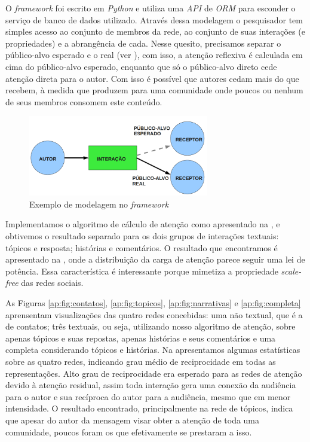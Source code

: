 O \emph{framework} foi escrito em \emph{Python} e utiliza uma \emph{API} de
\emph{ORM} para esconder o serviço de banco de dados utilizado. Através dessa
modelagem o pesquisador tem simples acesso ao conjunto de membros da rede, ao
conjunto de suas interações (e propriedades) e a abrangência de cada. Nesse
quesito, precisamos separar o público-alvo esperado e o real (ver
), com isso, a atenção reflexiva é calculada em cima do
público-alvo esperado, enquanto que só o público-alvo direto cede atenção direta
para o autor. Com isso é possível que autores cedam mais do que recebem, à medida
que produzem para uma comunidade onde poucos ou nenhum de seus membros consomem
este conteúdo.

\begin{figure}[h!]
  \centering
    \includegraphics[width=0.7\textwidth]{imgs/naif-grafo.png}
  \caption{Exemplo de modelagem no \emph{framework}}
    \label{ap:fig:grafo}
\end{figure}

Implementamos o algoritmo de cálculo de atenção como apresentado na
, e obtivemos o resultado separado para os dois grupos
de interações textuais: tópicos e resposta; histórias e comentários. O resultado
que encontramos é apresentado na , onde a distribuição da
carga de atenção parece seguir uma lei de potência. Essa característica é
interessante porque mimetiza a propriedade \emph{scale-free} das redes
sociais. 

As Figuras \ref{ap:fig:contatos}, \ref{ap:fig:topicos}, \ref{ap:fig:narrativas} e
\ref{ap:fig:completa} aprensentam visualizações das quatro redes concebidas: uma
não textual, que é a de contatos; três textuais, ou seja, utilizando nosso
algoritmo de atenção, sobre apenas tópicos e suas repostas, apenas histórias e
seus comentários e uma completa considerando tópicos e histórias. Na
 apresentamos algumas estatísticas sobre as quatro
redes, indicando grau médio de reciprocidade em todas as representações. Alto
grau de reciprocidade era esperado para as redes de atenção devido à atenção
residual, assim toda interação gera uma conexão da audiência para o autor e sua
recíproca do autor para a audiência, mesmo que em menor intensidade. O resultado
encontrado, principalmente na rede de tópicos, indica que apesar do autor da
mensagem visar obter a atenção de toda uma comunidade, poucos foram os que
efetivamente se prestaram a isso.

